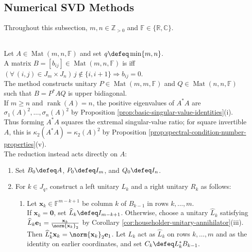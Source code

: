 \subsection{Numerical SVD Methods}

Throughout this subsection, $m,n\in\mathbb{Z}_{>0}$ and $\mathbb{F}\in\{\mathbb{R},\mathbb{C}\}$.

\begin{computationmethod} \label{meth:svd-numerics-preview} \\
Let $A\in\operatorname{Mat}(m,n,\mathbb{F})$ and set $q\defeq\min\limits\{m,n\}$.\\
A matrix $B=[b_{ij}]\in\operatorname{Mat}(m,n,\mathbb{F})$ is  iff $(\forall\,(i,j)\in J_m\times J_n)\,j\notin\{i,i+1\}\Longrightarrow b_{ij}=0$.\\
The method constructs unitary $P\in\operatorname{Mat}(m,m,\mathbb{F})$ and $Q\in\operatorname{Mat}(n,n,\mathbb{F})$ such that $B=P^*AQ$ is upper bidiagonal.\\
If $m\geq n$ and $\operatorname{rank}(A)=n$, the positive eigenvalues of $A^*A$ are $\sigma_1(A)^2,\ldots,\sigma_n(A)^2$ by Proposition \ref{prop:basic-singular-value-identities}(i).\\
Thus forming $A^*A$ squares the extremal singular-value ratio; for square invertible $A$, this is $\kappa_2(A^*A)=\kappa_2(A)^2$ by Proposition \ref{prop:spectral-condition-number-properties}(v).\\
The reduction instead acts directly on $A$:
\begin{enumerate}[label=(\roman*)]
\setlength{\itemsep}{0pt}
\item Set $B_0\defeq A$, $P_0\defeq I_m$, and $Q_0\defeq I_n$.
\item For $k\in J_q$, construct a left unitary $L_k$ and a right unitary $R_k$ as follows:
\begin{enumerate}[label=(\alph*)]
\setlength{\itemsep}{0pt}
\item Let $\mathbf{x}_k\in\mathbb{F}^{m-k+1}$ be column $k$ of $B_{k-1}$ in rows $k,\ldots,m$.\\
If $\mathbf{x}_k=\mathbf{0}$, set $\widehat{L}_k\defeq I_{m-k+1}$. Otherwise, choose a unitary $\widehat{L}_k$ satisfying $\widehat{L}_k\mathbf{e}_1=\frac{\mathbf{x}_k}{\norm{\mathbf{x}_k}_2}$ by Corollary \ref{cor:householder-unitary-annihilator}(iii).\\
Then $\widehat{L}_k^*\mathbf{x}_k=\norm{\mathbf{x}_k}_2\mathbf{e}_1$. Let $L_k$ act as $\widehat{L}_k$ on rows $k,\ldots,m$ and as the identity on earlier coordinates, and set $C_k\defeq L_k^*B_{k-1}$.

\end{enumerate}
\end{enumerate}
\end{computationmethod}

